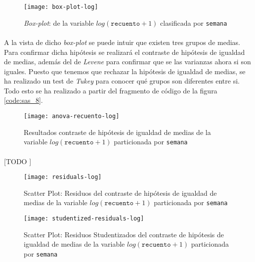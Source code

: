 \documentclass[11pt]{article}
\begin{document}
      \begin{figure}
        \centering
        \texttt{[image: box-plot-log]}
        \caption{\emph{Box-plot}: de la variable $log(\texttt{recuento} + 1)$ clasificada por \texttt{semana}}
        \label{img:box-plot-log}
      \end{figure}

      \paragraph{}
      A la vista de dicho \emph{box-plot} se puede intuir que existen tres grupos de medias. Para confirmar dicha hipótesis se realizará el contraste de hipótesis de igualdad de medias, además del de \emph{Levene} para confirmar que se las varianzas ahora si son iguales. Puesto que tenemos que rechazar la hipótesis de igualdad de medias, se ha realizado un test de \emph{Tukey} para conocer qué grupos son diferentes entre si. Todo esto se ha realizado a partir del fragmento de código de la figura \ref{code:sas_8}.

      \begin{figure}[!h]
        \centering
        \texttt{[image: anova-recuento-log]}
        \caption{Resultados contraste de hipótesis de igualdad de medias de la variable $log(\texttt{recuento}+1)$ particionada por \texttt{semana}}
        \label{img:anova-recuento-log}
      \end{figure}

      \paragraph{}
      [TODO ]

      \begin{figure}[!h]
        \centering
        \begin{minipage}{.49\textwidth}
          \centering
          \texttt{[image: residuals-log]}
          \caption{Scatter Plot: Residuos del contraste de hipótesis de igualdad de medias de la variable $log(\texttt{recuento}+1)$ particionada por \texttt{semana}}
          \label{fig:scatter-plot-residuals-log}
        \end{minipage}
        \begin{minipage}{.49\textwidth}
          \centering
          \texttt{[image: studentized-residuals-log]}
          \caption{Scatter Plot: Residuos Studentizados del contraste de hipótesis de igualdad de medias de la variable $log(\texttt{recuento}+1)$ particionada por \texttt{semana}}
          \label{fig:scatter-plot-studentized-residuals-log}
        \end{minipage}
      \end{figure}
\end{document}
